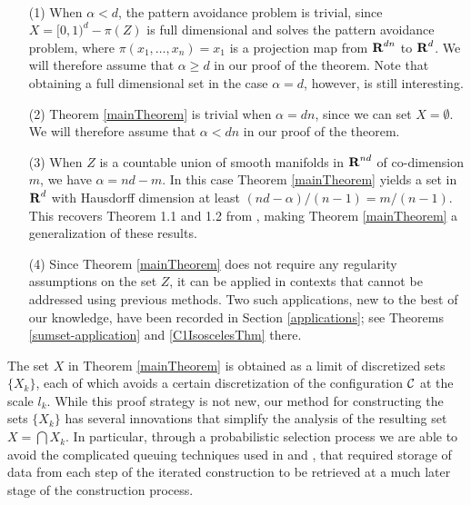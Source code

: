 \begin{remarks}
	\
	\begin{enumerate}
		\item[(1)] When $\alpha < d$, the pattern avoidance problem is trivial, since $X = [0,1)^d - \pi(Z)$ is full dimensional and solves the pattern avoidance problem, where $\pi(x_1, \dots, x_n) = x_1$ is a projection map from $\operatorname{\mathbf{R}}^{dn}$ to $\operatorname{\mathbf{R}}^d$. We will therefore assume that $\alpha \geq d$ in our proof of the theorem. Note that obtaining a full dimensional set in the case $\alpha = d$, however, is still interesting.

		\item[(2)] Theorem \ref{mainTheorem} is trivial when $\alpha = dn$, since we can set $X = \emptyset$. We will therefore assume that $\alpha < dn$ in our proof of the theorem.

		\item[(3)] When $Z$ is a countable union of smooth manifolds in $\operatorname{\mathbf{R}}^{nd}$ of co-dimension $m$, we have $\alpha = nd - m$. In this case Theorem \ref{mainTheorem} yields a set in $\operatorname{\mathbf{R}}^d$ with Hausdorff dimension at least $(nd - \alpha)/(n-1) = m/(n-1)$. This recovers Theorem 1.1 and 1.2 from \cite{MalabikaRob}, making Theorem \ref{mainTheorem} a generalization of these results.

		\item[(4)] Since Theorem \ref{mainTheorem} does not require any regularity assumptions on the set $Z$, it can be applied in contexts that cannot be addressed using previous methods. Two such applications, new to the best of our knowledge, have been recorded in Section \ref{applications}; see Theorems \ref{sumset-application} and \ref{C1IsoscelesThm} there.
	\end{enumerate}
\end{remarks}

The set $X$ in Theorem \ref{mainTheorem} is obtained as a limit of discretized sets $\{ X_k \}$, each of which avoids a certain discretization of the configuration $\operatorname{\mathcal{C}}$ at the scale $l_k$. While this proof strategy is not new, our method for constructing the sets $\{X_k\}$ has several innovations that simplify the analysis of the resulting set $X=\bigcap X_k$. In particular, through a probabilistic selection process we are able to avoid the complicated queuing techniques used in \cite{KeletiDimOneSet} and \cite{MalabikaRob}, that required storage of data from each step of the iterated construction to be retrieved at a much later stage of the construction process.

